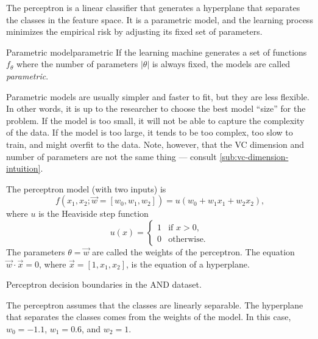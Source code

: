 The perceptron is a linear classifier that generates a hyperplane that separates the
classes in the feature space.  It is a parametric model, and the learning process minimizes the empirical risk
by adjusting its fixed set of parameters.

\begin{defbox}{Parametric model}{parametric}
  If the learning machine generates a set of functions $f_\theta$ where the number of
  parameters $|\theta|$ is always fixed, the models are called \emph{parametric}.
\end{defbox}

Parametric models are usually simpler and faster to fit, but they are less flexible.  In
other words, it is up to the researcher to choose the best model ``size'' for the problem.
If the model is too small, it will not be able to capture the complexity of the data.  If
the model is too large, it tends to be too complex, too slow to train, and might overfit to
the data.  Note, however, that the VC dimension and number of parameters are not the same
thing --- consult \cref{sub:vc-dimension-intuition}.

The perceptron model (with two inputs) is
\begin{equation*}
  f(x_1, x_2; \vec{w} = \left[w_0, w_1, w_2\right]) = u(w_0 + w_1 x_1 + w_2 x_2)\text{,}
\end{equation*}
where $u$ is the Heaviside step function
\begin{equation*}
  u(x) = \begin{cases}
    1 & \text{if } x > 0\text{,} \\
    0 & \text{otherwise.}
  \end{cases}
\end{equation*}
The parameters $\theta = \vec{w}$ are called the weights of the perceptron.
The equation $\vec{w} \cdot \vec{x} = 0$, where $\vec{x} = [1, x_1,
x_2]$, is the equation of a hyperplane.

\begin{figurebox}[label=fig:perceptron-and]{Perceptron decision boundaries in the AND dataset.}
  \centering
  \tcblower
  The perceptron assumes that the classes are linearly separable.
  The hyperplane that separates the classes comes from the weights of the model.
  In this case, $w_0 = -1.1$, $w_1 = 0.6$, and $w_2 = 1$.
\end{figurebox}

